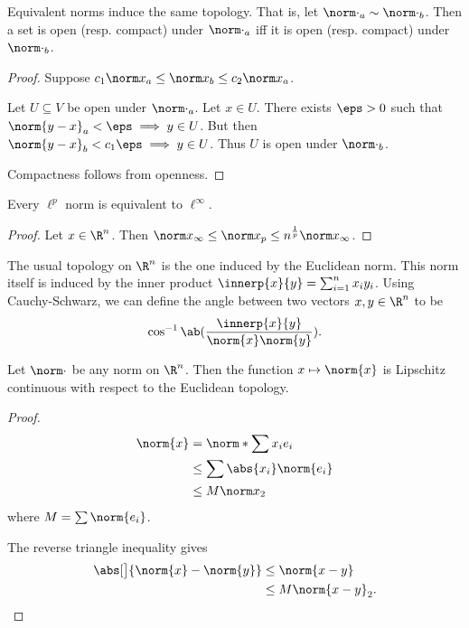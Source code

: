 \begin{proposition}
    Equivalent norms induce the same topology.
    That is, let ${\norm\cdot}_a \sim {\norm\cdot}_b$.
    Then a set is open (resp. compact) under ${\norm\cdot}_a$ iff it is
    open (resp. compact) under ${\norm\cdot}_b$.
\end{proposition}
\begin{proof}
    Suppose $c_1 {\norm x}_a \le {\norm x}_b \le c_2 {\norm x}_a$.

    Let $U \subseteq V$ be open under ${\norm\cdot}_a$.
    Let $x \in U$.
    There exists $\eps > 0$ such that
    ${\norm{y - x}}_a < \eps \implies y \in U$.
    But then ${\norm{y - x}}_b < c_1 \eps \implies y \in U$.
    Thus $U$ is open under ${\norm\cdot}_b$.

    Compactness follows from openness.
\end{proof}

\begin{proposition} \label{thm:norm:eq-lp}
    Every $\ell^p$ norm is equivalent to $\ell^\infty$.
\end{proposition}
\begin{proof}
    Let $x \in \R^n$.
    Then ${\norm x}_\infty \le {\norm x}_p \le n^{\frac1p} {\norm x}_\infty$.
\end{proof}

The usual topology on $\R^n$ is the one induced by the Euclidean norm.
This norm itself is induced by the inner product
$\innerp{x}{y} = \sum_{i=1}^n x_i y_i$. %
Using Cauchy-Schwarz, we can define the angle between two vectors
$x, y \in \R^n$ to be \[
    \cos^{-1} \ab(\frac{\innerp{x}{y}}{\norm{x} \norm{y}}).
\]

\begin{lemma*} \label{thm:norm:cont}
    Let $\norm\cdot$ be any norm on $\R^n$.
    Then the function $x \mapsto \norm{x}$ is Lipschitz continuous
    with respect to the Euclidean topology.
\end{lemma*}
\begin{proof}
    \begin{align*}
        \norm{x} &= \norm*{\sum x_i e_i} \\
            &\le \sum \abs{x_i} \norm{e_i} \\
            &\le M {\norm x}_2
    \end{align*} where $M = \sum \norm{e_i}$.

    The reverse triangle inequality gives
    \begin{align*}
        \abs[\big]{\norm{x} - \norm{y}} &\le \norm{x - y} \\
            &\le M {\norm{x - y}}_2. \qedhere
    \end{align*}
\end{proof}


